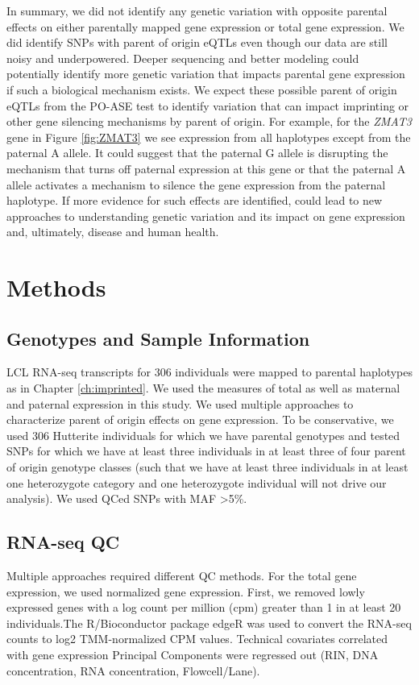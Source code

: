 In summary, we did not identify any genetic variation with opposite parental effects on either parentally mapped gene expression or total gene expression. We did identify SNPs with parent of origin eQTLs even though our data are still noisy and underpowered. Deeper sequencing and better modeling could potentially identify more genetic variation that impacts parental gene expression if such a biological mechanism exists. We expect these possible parent of origin eQTLs from the PO-ASE test to identify variation that can impact imprinting or other gene silencing mechanisms by parent of origin. For example, for the \emph{ZMAT3} gene in Figure \ref{fig:ZMAT3} we see expression from all haplotypes except from the paternal A allele. It could suggest that the paternal G allele is disrupting the mechanism that turns off paternal expression at this gene or that the paternal A allele activates a mechanism to silence the gene expression from the paternal haplotype. If more evidence for such effects are identified, could lead to new approaches to understanding genetic variation and its impact on gene expression and, ultimately, disease and human health. 

\section{Methods}\label{ch04-methods}

\subsection{Genotypes and Sample Information}\label{Genotypes and Sample Information}
LCL RNA-seq transcripts for 306 individuals were mapped to parental haplotypes as in Chapter \ref{ch:imprinted}. We used the measures of total as well as maternal and paternal expression in this study. We used multiple approaches to characterize parent of origin effects on gene expression. To be conservative, we used 306 Hutterite individuals for which we have parental genotypes and tested SNPs for which we have at least three individuals in at least three of four parent of origin genotype classes (such that we have at least three individuals in at least one heterozygote category and one heterozygote individual will not drive our analysis). We used QCed SNPs with MAF \textgreater 5\%.

\subsection{RNA-seq QC}\label{RNA-seq QC}
Multiple approaches required different QC methods. For the total gene expression, we used normalized gene expression. First, we removed lowly expressed genes with a log count per million (cpm) greater than 1 in at least 20 individuals.The R/Bioconductor package edgeR was used to convert the RNA-seq counts to log2 TMM-normalized CPM values\cite{Robinson:2010dd,Robinson:2010cw}. Technical covariates correlated with gene expression Principal Components were regressed out (RIN, DNA concentration, RNA concentration, Flowcell/Lane). 

